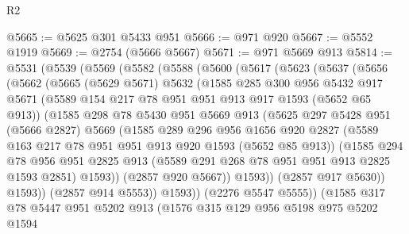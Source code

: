 \begin{lexlean}{R2}
\begin{coremodule}
@5665 := @5625 @301 @5433 @951
@5666 := @971 @920
@5667 := @5552 @1919
@5669 := @2754 (@5666 @5667)
@5671 := @971 @5669 @913
@5814 := @5531
    (@5539
      (@5569
        (@5582
          (@5588
            (@5600
              (@5617
                (@5623
                  (@5637
                    (@5656
                      (@5662
                        (@5665
                          (@5629 @5671)
                          @5632
                          (@1585
                            @285
                            @300
                            @956
                            @5432
                            @917
                            @5671
                            (@5589 @154 @217 @78 @951 @951 @913 @917 @1593 (@5652 @65 @913))
                            (@1585
                              @298
                              @78
                              @5430
                              @951
                              @5669
                              @913
                              (@5625
                                @297
                                @5428
                                @951
                                (@5666 @2827)
                                @5669
                                (@1585
                                  @289
                                  @296
                                  @956
                                  @1656
                                  @920
                                  @2827
                                  (@5589 @163 @217 @78 @951 @951 @913 @920 @1593 (@5652 @85 @913))
                                  (@1585
                                    @294
                                    @78
                                    @956
                                    @951
                                    @2825
                                    @913
                                    (@5589 @291 @268 @78 @951 @951 @913 @2825 @1593 @2851)
                                    @1593))
                                (@2857 @920 @5667))
                              @1593))
                          (@2857 @917 @5630))
                        @1593))
                    (@2857 @914 @5553))
                  @1593))
              (@2276 @5547 @5555))
            (@1585
              @317
              @78
              @5447
              @951
              @5202
              @913
              (@1576
                @315
                @129
                @956
                @5198
                @975
                @5202
                @1594

\end{coremodule}
\end{lexlean}
